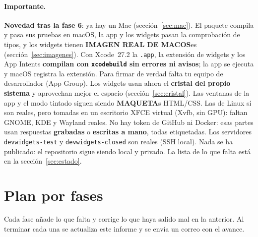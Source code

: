 \documentclass[11pt,a4paper]{article}
\newcommand{\maqueta}{\textcolor{aviso}{\textbf{MAQUETA}}}
\newcommand{\imagenreal}{\textcolor{real}{\textbf{IMAGEN REAL DE MACOS}}}
\begin{document}
\paragraph{Importante.} \textbf{Novedad tras la fase 6}: ya hay un
Mac (sección~\ref{sec:mac}). El paquete compila y pasa sus pruebas
en macOS, la app y los widgets pasan la comprobación de tipos, y los
widgets tienen \imagenreal{}es (sección~\ref{sec:imagenes}). Con
Xcode~27.2 la \texttt{.app}, la extensión de widgets y los App
Intents \textbf{compilan con \texttt{xcodebuild} sin errores ni
avisos}; la app se ejecuta y macOS registra la extensión. Para firmar
de verdad falta tu equipo de desarrollador (App Group). Los widgets
usan ahora el \textbf{cristal del propio sistema} y aprovechan mejor
el espacio (sección~\ref{sec:cristal}). Las
ventanas de la app y el modo tintado siguen siendo \maqueta{}s
HTML/CSS. Las de Linux sí son reales, pero tomadas en un escritorio
XFCE virtual (Xvfb, sin GPU): faltan GNOME, KDE y Wayland reales. No
hay token de GitHub ni Docker: esas partes usan respuestas
\textbf{grabadas} o \textbf{escritas a mano}, todas etiquetadas. Los
servidores \texttt{devwidgets-test} y \texttt{devwidgets-closed} son
reales (SSH local). Nada se ha publicado: el repositorio sigue siendo
local y privado. La lista de lo que falta está en la
sección~\ref{sec:estado}.

\section{Plan por fases}
Cada fase añade lo que falta y corrige lo que haya salido mal en la
anterior. Al terminar cada una se actualiza este informe y se envía
un correo con el avance.
\end{document}
